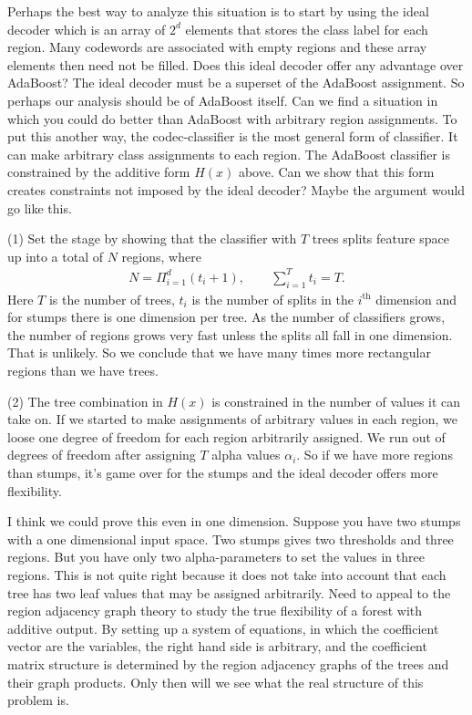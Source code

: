 \documentclass{article}
\begin{document}
Perhaps the best way to analyze this situation is to start by using the ideal decoder which is an array of $2^d$ elements that stores the class label for each region.  Many codewords are associated with empty regions and these array elements then need not be filled.  Does this ideal decoder offer any advantage over AdaBoost?  The ideal decoder must be a superset of the AdaBoost assignment.  So perhaps our analysis should be of AdaBoost itself.  Can we find a situation in which you could do better than AdaBoost with arbitrary region assignments.  To put this another way, the codec-classifier is the most general form of classifier.  It can make arbitrary class assignments to each region.  The AdaBoost classifier is constrained by the additive form $H(x)$ above.  Can we show that this form creates constraints not imposed by the ideal decoder?  Maybe the argument would go like this.

(1) Set the stage by showing that the classifier with $T$ trees splits feature space up into a total of $N$ regions, where
\begin{gather*}
N = \Pi_{i=1}^d (t_i + 1), \qquad \sum_{i=1}^T t_i = T.
\end{gather*}
Here $T$ is the number of trees, $t_i$ is the number of splits in the $i^\text{th}$ dimension and for stumps there is one dimension per tree.  As the number of classifiers grows, the number of regions grows very fast unless the splits all fall in one dimension.  That is unlikely.  So we conclude that we have many times more rectangular regions than we have trees.

(2) The tree combination in $H(x)$ is constrained in the number of values it can take on.  If we started to make assignments of arbitrary values in each region, we loose one degree of freedom for each region arbitrarily assigned.  We run out of degrees of freedom after assigning $T$ alpha values $\alpha_i$.  So if we have more regions than stumps, it's game over for the stumps and the ideal decoder offers more flexibility.

I think we could prove this even in one dimension.  Suppose you have two stumps with a one dimensional input space.  Two stumps gives two thresholds and three regions.  But you have only two alpha-parameters to set the values in three regions.  This is not quite right because it does not take into account that each tree has two leaf values that may be assigned arbitrarily.  Need to appeal to the region adjacency graph theory to study the true flexibility of a forest with additive output.  By setting up a system of equations, in which the coefficient vector are the variables, the right hand side is arbitrary, and the coefficient matrix structure is determined by the region adjacency graphs of the trees and their graph products.  Only then will we see what the real structure of this problem is.
\end{document}
